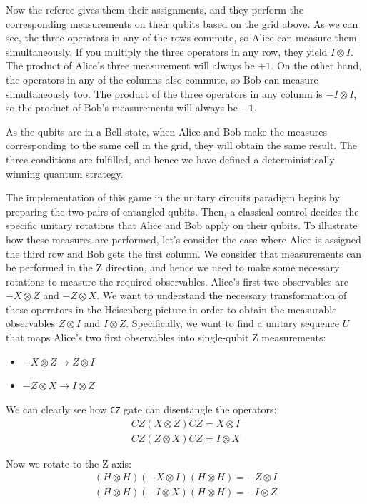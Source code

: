 \documentclass[12pt, twoside, openany]{book}
\begin{document}
Now the referee gives them their assignments, and they perform the corresponding measurements on their qubits based on the grid above. As we can see, the three operators in any of the rows commute, so Alice can measure them simultaneously. If you multiply the three operators in any row, they yield $I \otimes I$. The product of Alice's three measurement will always be $+1$. On the other hand, the operators in any of the columns also commute, so Bob can measure simultaneously too. The product of the three operators in any column is $-I \otimes I$, so the product of Bob's measurements will always be $-1$. 

As the qubits are in a Bell state, when Alice and Bob make the measures corresponding to the same cell in the grid, they will obtain the same result. The three conditions are fulfilled, and hence we have defined a deterministically winning quantum strategy. 

The implementation of this game in the unitary circuits paradigm begins by preparing the two pairs of entangled qubits. Then, a classical control decides the specific unitary rotations that Alice and Bob apply on their qubits. To illustrate how these measures are performed, let's consider the case where Alice is assigned the third row and Bob gets the first column. We consider that measurements can be performed in the Z direction, and hence we need to make some necessary rotations to measure the required observables. Alice's first two observables are $-X \otimes Z$ and $-Z \otimes X$. We want to understand the necessary transformation of these operators in the Heisenberg picture in order to obtain the measurable observables $Z \otimes I$ and $I \otimes Z$. Specifically, we want to find a unitary sequence $U$ that maps Alice's two first observables into single-qubit Z measurements:
\begin{itemize}
    \item $-X \otimes Z \rightarrow Z \otimes I$
    \item $-Z \otimes X \rightarrow I \otimes Z$
\end{itemize}
We can clearly see how \texttt{CZ} gate can disentangle the operators:
\begin{align*}
    CZ (X \otimes Z) CZ = X \otimes I \\
    CZ (Z \otimes X) CZ = I \otimes X
\end{align*}

Now we rotate to the Z-axis:
\begin{align*}
    (H \otimes H)(-X \otimes I)(H \otimes H) = -Z \otimes I \\
    (H \otimes H)(-I \otimes X)(H \otimes H) = -I \otimes Z
\end{align*}
\end{document}
